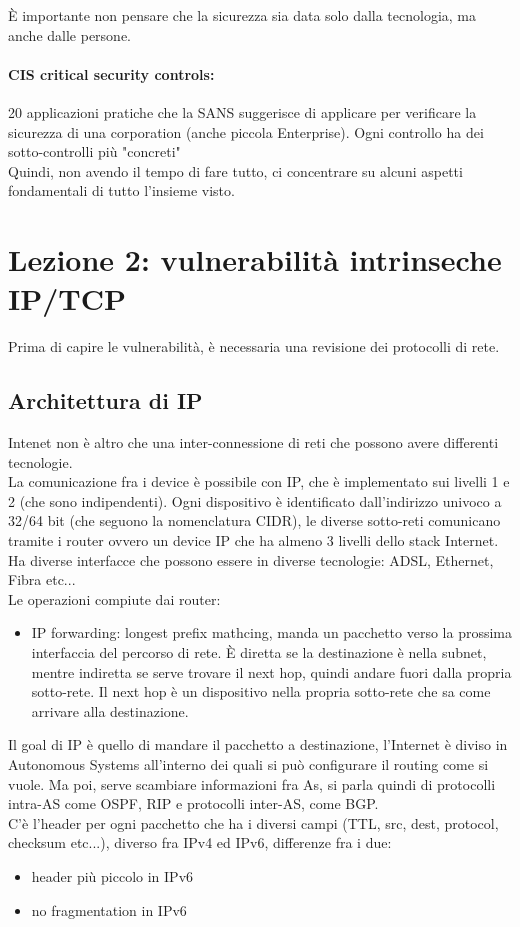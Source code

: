 \documentclass[12pt, oneside]{extbook} %
\begin{document}
È importante non pensare che la sicurezza sia data solo dalla tecnologia, ma anche dalle persone.\\ \paragraph{CIS critical security controls:} 20 applicazioni pratiche che la SANS suggerisce di applicare per verificare la sicurezza di una corporation (anche piccola Enterprise). Ogni controllo ha dei sotto-controlli più "concreti"\\ Quindi, non avendo il tempo di fare tutto, ci concentrare su alcuni aspetti fondamentali di tutto l'insieme visto.
\section{Lezione 2: vulnerabilità intrinseche IP/TCP}
Prima di capire le vulnerabilità, è necessaria una revisione dei protocolli di rete.
\subsection{Architettura di IP}
Intenet non è altro che una inter-connessione di reti che possono avere differenti tecnologie.\\ La comunicazione fra i device è possibile con IP, che è implementato sui livelli 1 e 2 (che sono indipendenti). Ogni dispositivo è identificato dall'indirizzo univoco a 32/64 bit (che seguono la nomenclatura CIDR), le diverse sotto-reti comunicano tramite i router ovvero un device IP che ha almeno 3 livelli dello stack Internet. Ha diverse interfacce che possono essere in diverse tecnologie: ADSL, Ethernet, Fibra etc...\\ Le operazioni compiute dai router:
\begin{itemize}
\item IP forwarding: longest prefix mathcing, manda un pacchetto verso la prossima interfaccia del percorso di rete. È diretta se la destinazione è nella subnet, mentre indiretta se serve trovare il next hop, quindi andare fuori dalla propria sotto-rete. Il next hop è un dispositivo nella propria sotto-rete che sa come arrivare alla destinazione.
\end{itemize}
Il goal di IP è quello di mandare il pacchetto a destinazione, l'Internet è diviso in Autonomous Systems all'interno dei quali si può configurare il routing come si vuole. Ma poi, serve scambiare informazioni fra As, si parla quindi di protocolli intra-AS come OSPF, RIP e protocolli inter-AS, come BGP.\\ C'è l'header per ogni pacchetto che ha i diversi campi (TTL, src, dest, protocol, checksum etc...), diverso fra IPv4 ed IPv6, differenze fra i due:
\begin{itemize}
\item header più piccolo in IPv6
\item no fragmentation in IPv6
\end{itemize}
\end{document}
